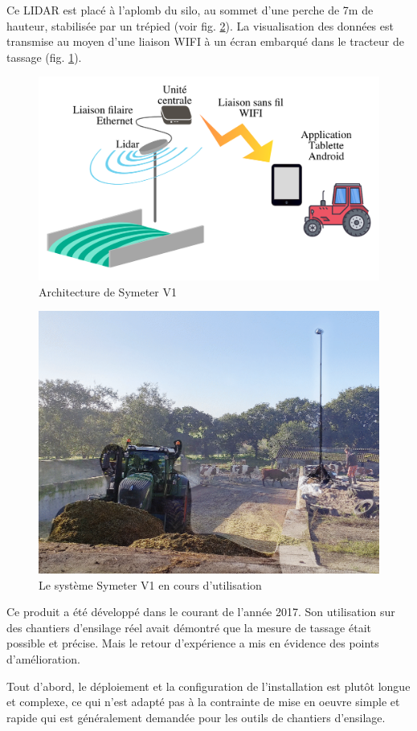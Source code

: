 \documentclass[12pt,a4paper]{report}
\begin{document}
		\para Ce LIDAR est placé à l'aplomb du silo, au sommet d'une perche de 7m de hauteur, stabilisée par un trépied (voir fig. \ref{fig:symeterv1}). La visualisation des données est transmise au moyen d'une liaison WIFI à un écran embarqué dans le tracteur de tassage (fig. \ref{fig:archigenv1}).
		
		\begin{figure}[h!]
			\centering
			\includegraphics[width=0.6\linewidth]{img/ArchiGenV1}
			\caption[archisymv1]{Architecture de Symeter V1}
			\label{fig:archigenv1}
		\end{figure}
		
		
		\begin{figure}[h!]
			\centering
			\includegraphics[width=0.6\linewidth]{img/symeterv1}
			\caption[symeterv1]{Le système Symeter V1 en cours d'utilisation}
			\label{fig:symeterv1}
		\end{figure}
		
		
		\para Ce produit a été développé dans le courant de l'année 2017. Son utilisation sur des chantiers d'ensilage réel avait démontré que la mesure de tassage était possible et précise. Mais le retour d'expérience a mis en évidence des points d'amélioration.
		
		\para Tout d'abord, le déploiement et la configuration de l'installation est plutôt longue et complexe, ce qui n'est adapté pas à la contrainte de mise en oeuvre simple et rapide qui est généralement demandée pour les outils de chantiers d'ensilage.
		
\end{document}
